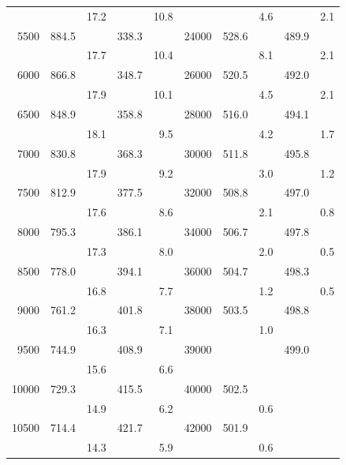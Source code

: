 \documentclass[11pt]{article}
\begin{document}
\begin{center}
\begin{tabular}{|r|r|r|r|r||r|r|r|r|r|}
     &       & 17.2 &       & 10.8 &      &       & 4.6  &       & 2.1 \\
5500 & 884.5 &      & 338.3 &     & 24000 & 528.6 &      & 489.9 &     \\
     &       & 17.7 &       & 10.4 &      &       & 8.1  &       & 2.1 \\
6000 & 866.8 &      & 348.7 &     & 26000 & 520.5 &      & 492.0 &     \\
     &       & 17.9 &       & 10.1 &      &       & 4.5  &       & 2.1 \\
6500 & 848.9 &      & 358.8 &     & 28000 & 516.0 &      & 494.1 &     \\
     &       & 18.1 &       & 9.5  &      &       & 4.2  &       & 1.7 \\
7000 & 830.8 &      & 368.3 &     & 30000 & 511.8 &      & 495.8 &     \\
     &       & 17.9 &       & 9.2  &      &       & 3.0  &       & 1.2 \\
7500 & 812.9 &      & 377.5 &     & 32000 & 508.8 &      & 497.0 &     \\
     &       & 17.6 &       & 8.6  &      &       & 2.1  &       & 0.8 \\
8000 & 795.3 &      & 386.1 &     & 34000 & 506.7 &      & 497.8 &     \\
     &       & 17.3 &       & 8.0  &      &       & 2.0  &       & 0.5 \\
8500 & 778.0 &      & 394.1 &     & 36000 & 504.7 &      & 498.3 &     \\
     &       & 16.8 &       & 7.7  &      &       & 1.2  &       & 0.5 \\
9000 & 761.2 &      & 401.8 &     & 38000 & 503.5 &      & 498.8 &     \\
     &       & 16.3 &       & 7.1  &      &       & 1.0  &       &     \\
9500 & 744.9 &      & 408.9 &     & 39000 &       &      & 499.0 &     \\
     &       & 15.6 &       & 6.6  &      &       &      &       &     \\
10000 & 729.3 &      & 415.5 &     & 40000 & 502.5 &      &       &     \\
     &       & 14.9 &       & 6.2  &      &       & 0.6  &       &     \\
10500 & 714.4 &      & 421.7 &     & 42000 & 501.9 &      &       &     \\
     &       & 14.3 &       & 5.9  &      &       & 0.6  &       &     \\

\end{tabular}
\end{center}
\end{document}

